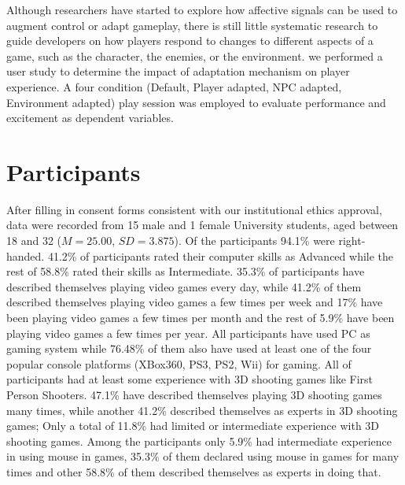 
Although researchers have started to explore how affective signals can be used to augment control or adapt gameplay, there is still little systematic research to guide developers on how players respond to changes to different aspects of a game, such as the character, the enemies, or the environment. we performed a user study to determine the impact of adaptation mechanism on player experience. A four condition (Default, Player adapted, NPC adapted, Environment adapted) play session was employed to evaluate performance and excitement as dependent variables.

\section{Participants}
After filling in consent forms consistent with our institutional ethics approval, data were recorded from 15 male and 1 female University students, aged between 18 and 32 ($M = 25.00$, $SD = 3.875$).
Of the participants 94.1\% were right-handed. 41.2\% of participants rated their computer skills as Advanced while the rest of 58.8\% rated their skills as Intermediate. 35.3\% of participants have described themselves playing video games every day, while 41.2\% of them described themselves playing video games a few times per week and 17\% have been playing video games a few times per month and the rest of 5.9\% have been playing video games a few times per year. All participants have used PC as gaming system while 76.48\% of them also have used at least one of the four popular console platforms (XBox360, PS3, PS2, Wii) for gaming. All of participants had at least some experience with 3D shooting games like First Person Shooters. 47.1\% have described themselves playing 3D shooting games many times, while another 41.2\% described themselves as experts in 3D shooting games; Only a total of 11.8\% had limited or intermediate experience with 3D shooting games. Among the participants only 5.9\% had intermediate experience in using mouse in games, 35.3\% of them declared using mouse in games for many times and other 58.8\% of them described themselves as experts in doing that.

